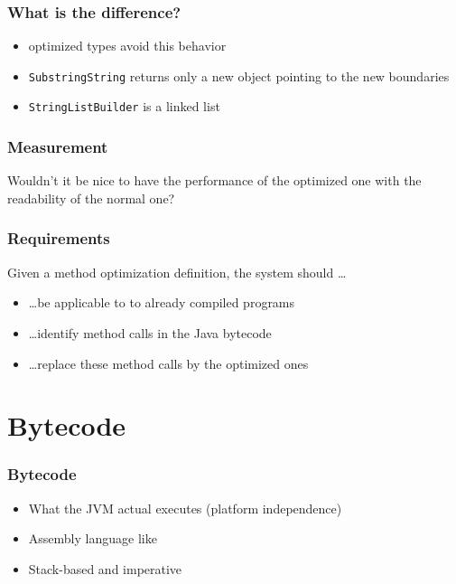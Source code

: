 \documentclass{beamer}
\begin{document}
\begin{frame}
  \frametitle{What is the difference?}
	\begin{itemize}
	  \item optimized types avoid this behavior 
	  \item \texttt{SubstringString} returns only a new object pointing to the new boundaries
	  \item \texttt{StringListBuilder} is a linked list
	\end{itemize} 
\end{frame}

\begin{frame}
  \frametitle{Measurement}

\end{frame}

\begin{frame}
  \begin{center}
  \huge Wouldn't it be nice to have the performance of the optimized one with the readability of the normal one?
  \end{center}

\end{frame}

\begin{frame}
  \frametitle{Requirements}  
  Given a method optimization definition, the system should \dots
  
  \begin{itemize}
    \item \dots be applicable to to already compiled programs
    \item \dots identify method calls in the Java bytecode
    \item \dots replace these method calls by the optimized ones
  \end{itemize}
\end{frame}

\section{Bytecode}

\frame{\sectionpage}

\begin{frame}
   \frametitle{Bytecode}
   \begin{itemize}
      \item What the JVM actual executes (platform independence)
      \item Assembly language like 
      \item Stack-based and imperative
   \end{itemize}    
\end{frame}
\end{document}
